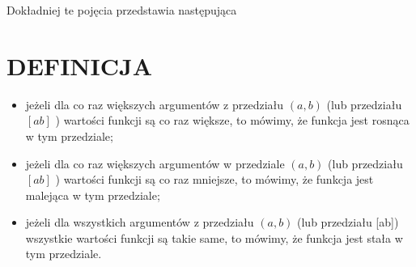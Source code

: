 \documentclass[10pt]{article}
\begin{document}
Dokładniej te pojęcia przedstawia następująca

\section*{DEFINICJA}
\begin{itemize}
  \item jeżeli dla co raz większych argumentów z przedziału \((a, b)\) (lub przedziału \([a b]\) ) wartości funkcji są co raz większe, to mówimy, że funkcja jest rosnąca w tym przedziale;
  \item jeżeli dla co raz większych argumentów w przedziale \((a, b)\) (lub przedziału \([a b]\) ) wartości funkcji są co raz mniejsze, to mówimy, że funkcja jest malejąca w tym przedziale;
  \item jeżeli dla wszystkich argumentów z przedziału \((a, b)\) (lub przedziału [ab]) wszystkie wartości funkcji są takie same, to mówimy, że funkcja jest stała w tym przedziale.
\end{itemize}
\end{document}
